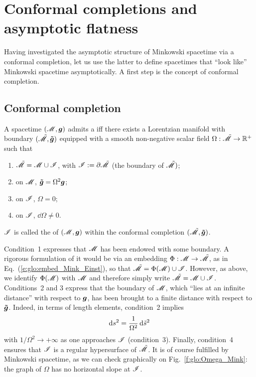 
\section{Conformal completions and asymptotic flatness} \label{s:glo:conf_compl}

Having investigated the asymptotic structure of Minkowski spacetime
via a conformal completion, let us use the latter to define spacetimes
that ``look like'' Minkowski spacetime asymptotically.
A first step is the concept of conformal completion.

\subsection{Conformal completion}

\begin{greybox}
A spacetime $(\mathscr{M},\bm{g})$ admits a
iff there exists a Lorentzian manifold with boundary
$(\tilde{\mathscr{M}},\bm{\tilde{g}})$ equipped with a smooth non-negative scalar field
$\Omega: \tilde{\mathscr{M}} \rightarrow \mathbb{R}^+$
such that
\begin{enumerate}
\item $\tilde{\mathscr{M}} = \mathscr{M} \cup \mathscr{I}$, with $\mathscr{I} := \partial \tilde{\mathscr{M}}$
(the boundary of $\tilde{\mathscr{M}})$;
\item on $\mathscr{M}$, $\bm{\tilde{g}} = \Omega^2 \bm{g}$;
\item on $\mathscr{I}$, $\Omega=0$;
\item on $\mathscr{I}$, $\dd \Omega \not= 0$.
\end{enumerate}
$\mathscr{I}$ is called the 
of $(\mathscr{M},\bm{g})$ within
the conformal completion $(\tilde{\mathscr{M}},\bm{\tilde{g}})$.
\end{greybox}
Condition~1 expresses that $\mathscr{M}$ has been endowed with some boundary.
A rigorous formulation of it would be via an embedding $\Phi:\mathscr{M} \rightarrow \tilde{\mathscr{M}}$,
as in Eq.~(\ref{e:glo:embed_Mink_Einst}), so that
$\tilde{\mathscr{M}} = \Phi(\mathscr{M}) \cup \mathscr{I}$. However, as above, we identify $\Phi(\mathscr{M})$
with $\mathscr{M}$ and therefore simply write $\tilde{\mathscr{M}} = \mathscr{M} \cup \mathscr{I}$.
Conditions~2 and 3 express that the boundary of $\mathscr{M}$, which ``lies at an infinite
distance'' with respect to $\bm{g}$, has been brought to a
finite distance with respect to $\bm{\tilde{g}}$. Indeed, in terms of
length elements, condition~2
implies
\[
    \mathrm{d} s^2 = \frac{1}{\Omega^2} \, \mathrm{d} {\tilde s}^2
\]
with $1/\Omega^2 \rightarrow +\infty$ as one approaches $\mathscr{I}$
(condition~3).
Finally, condition~4 ensures
that $\mathscr{I}$ is a regular hypersurface of $\tilde{\mathscr{M}}$.
It is of course fulfilled by Minkowski spacetime, as we can check graphically
on Fig.~\ref{f:glo:Omega_Mink}: the graph of $\Omega$ has no horizontal slope
at $\mathscr{I}$.

